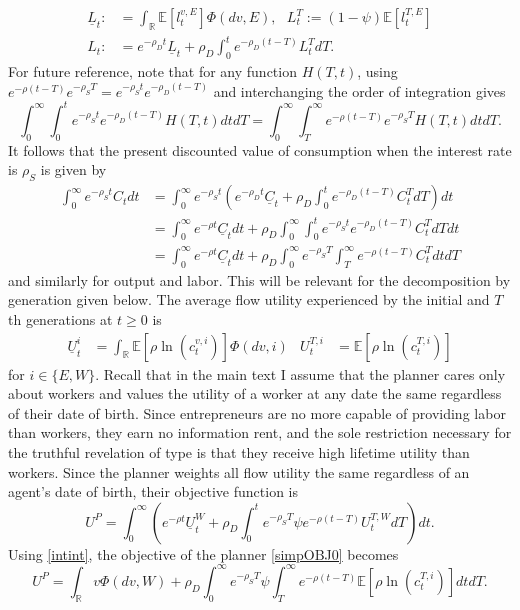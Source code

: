 \documentclass[11pt]{article}
\theoremstyle{plain}
\theoremstyle{definition} %
\begin{document}
\begin{align*}
\underline{L}_t : & = \int_{\mathbb{R}}\mathbb{E}[l^{v,E}_t]\Phi(dv, E), \ \ \ L^T_t := (1-\psi) \mathbb{E}[l^{T,E}_t]
\\ L_t : & = e^{- \rho_D t}\underline{L}_t  +  \rho_D\int_0^te^{-\rho_D (t-T)} L^T_tdT.
\end{align*}
For future reference, note that for any function $H(T,t)$, using $e^{-\rho (t-T)}e^{-\rho_S T} = e^{-\rho_S t} e^{-\rho_D (t-T)}$ and interchanging the order of integration gives
\begin{equation}
\int_0^{\infty}\int_0^t  e^{-\rho_S t} e^{-\rho_D (t-T)}H(T,t)dtdT = \int_0^{\infty}\int_T^{\infty} e^{-\rho (t-T)}e^{-\rho_S T}H(T,t)dtdT.
\label{intint}
\end{equation}
It follows that the present discounted value of consumption when the interest rate is $\rho_S$ is given by 
\begin{align*}
\int_0^{\infty} e^{-\rho_St} C_t dt & = \int_0^{\infty} e^{-\rho_St} {\left(e^{- \rho_D t}\underline{C}_t + \rho_D\int_0^te^{-\rho_D(t-T)} C^T_tdT\right)} dt
\\ & = \int_0^{\infty} e^{-\rho t} \underline{C}_t dt + \rho_D \int_0^{\infty} \int_0^t e^{-\rho_St} e^{-\rho_D (t-T)} C^T_tdT dt
\\ & = \int_0^{\infty} e^{-\rho t} \underline{C}_t dt + \rho_D \int_0^{\infty} e^{-\rho_S T} \int_T^{\infty} e^{-\rho (t-T)} C^T_tdtdT
\end{align*}
and similarly for output and labor. This will be relevant for the decomposition by generation given below. The average flow utility experienced by the initial and $T$th generations at $t \geq 0$ is
\begin{align*}
\underline{U}^i_t & = \int_{\mathbb{R}} \mathbb{E} [\rho \ln(c^{v,i}_t)]\Phi(dv, i) &
U^{T,i}_t & = \mathbb{E} [\rho \ln(c^{T,i}_t)]
\end{align*}
for $i \in \{E,W\}$. Recall that in the main text I assume that the planner cares only about workers and values the utility of a worker at any date the same regardless of their date of birth. Since entrepreneurs are no more capable of providing labor than workers, they earn no information rent, and the sole restriction necessary for the truthful revelation of type is that they receive high lifetime utility than workers. Since the planner weights all flow utility the same regardless of an agent's date of birth, their objective function is
\begin{equation}
U^P = \int_0^{\infty}{\left(e^{-\rho t}\underline{U}^W_t + \rho_D \int_0^te^{-\rho_S T}\psi e^{-\rho  (t-T)} U^{T,W}_tdT\right)}dt.
\label{simpOBJ0}
\end{equation}
Using \eqref{intint}, the objective of the planner \eqref{simpOBJ0} becomes 
\begin{equation} %
U^P = \int_{\mathbb{R}} v\Phi(dv,W) + \rho_D\int_0^{\infty}e^{-\rho_ST} \psi \int_T^{\infty}e^{-\rho (t-T)} \mathbb{E} [\rho \ln(c^{T,i}_t)]dt dT.
\label{simpOBJ}
\end{equation}
\end{document}
